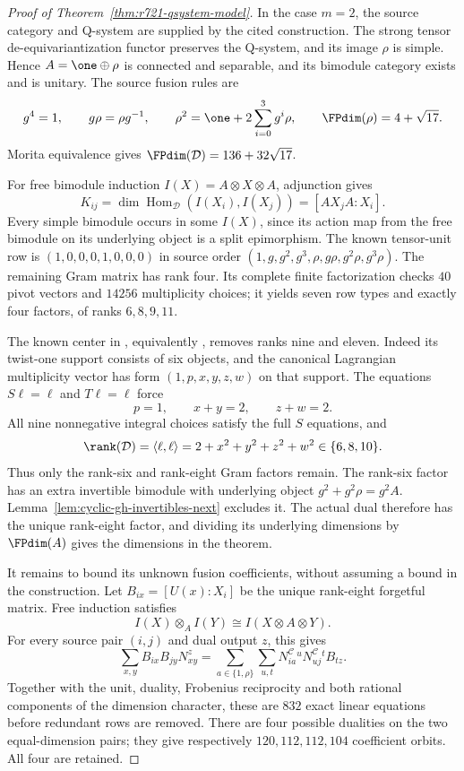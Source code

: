 \begin{proof}[Proof of Theorem~\ref{thm:r721-qsystem-model}]
In the case $m=2$, the source category and Q-system are supplied by the
cited construction. The strong tensor de-equivariantization functor
preserves the Q-system, and its image $\rho$ is simple. Hence
$A=\one\oplus\rho$ is connected and separable, and its bimodule category
exists and is unitary. The source fusion rules are
\[
 g^4=1,\qquad g\rho=\rho g^{-1},\qquad
 \rho^2=\one+2\sum_{i=0}^3g^i\rho,
 \qquad \FPdim(\rho)=4+\sqrt{17}.
\]
Morita equivalence gives
$\FPdim(\mathcal D)=136+32\sqrt{17}$.

For free bimodule induction $I(X)=A\otimes X\otimes A$, adjunction gives
\[
 K_{ij}=\dim\operatorname{Hom}_{\mathcal D}(I(X_i),I(X_j))
       =[A X_j A:X_i].
\]
Every simple bimodule occurs in some $I(X)$, since its action map from the
free bimodule on its underlying object is a split epimorphism.
The known tensor-unit row is $(1,0,0,0,1,0,0,0)$ in source order
$(1,g,g^2,g^3,\rho,g\rho,g^2\rho,g^3\rho)$.
The remaining Gram matrix has rank four. Its complete finite factorization
checks $40$ pivot vectors and $14256$ multiplicity choices; it yields seven
row types and exactly four factors, of ranks $6,8,9,11$.

The known center in
\cite[Theorem~6.8 and Example~6.10]{GrossmanIzumiCentersNext}, equivalently
\cite[Definition~6.1 and Section~6.1.6]{GrossmanIzumiMetricNext}, removes
ranks nine and eleven. Indeed its twist-one support consists of six objects,
and the canonical Lagrangian multiplicity vector has form
$(1,p,x,y,z,w)$ on that support. The equations $S\ell=\ell$ and
$T\ell=\ell$ force
\[
 p=1,\qquad x+y=2,\qquad z+w=2.
\]
All nine nonnegative integral choices satisfy the full $S$ equations, and
\[
 \rank(\mathcal D)=\langle\ell,\ell\rangle
       =2+x^2+y^2+z^2+w^2\in\{6,8,10\}.
\]
Thus only the rank-six and rank-eight Gram factors remain.
The rank-six factor has an extra invertible bimodule with underlying object
$g^2+g^2\rho=g^2A$. Lemma~\ref{lem:cyclic-gh-invertibles-next} excludes it.
The actual dual therefore has the unique rank-eight factor, and dividing
its underlying dimensions by $\FPdim(A)$ gives the dimensions in the theorem.

It remains to bound its unknown fusion coefficients, without assuming a
bound in the construction. Let $B_{i x}=[U(x):X_i]$ be the unique rank-eight
forgetful matrix. Free induction satisfies
\[
 I(X)\otimes_A I(Y)\cong I(X\otimes A\otimes Y).
\]
For every source pair $(i,j)$ and dual output $z$, this gives
\[
 \sum_{x,y}B_{i x}B_{j y}N_{xy}^{z}
   =\sum_{a\in\{1,\rho\}}\sum_{u,t}
        N^{\mathcal C}_{i a}{}^{u}
        N^{\mathcal C}_{u j}{}^{t} B_{t z}.
\]
Together with the unit, duality, Frobenius reciprocity and both rational
components of the dimension character, these are $832$ exact linear
equations before redundant rows are removed. There are four possible
dualities on the two equal-dimension pairs; they give respectively
$120,112,112,104$ coefficient orbits. All four are retained.


\end{proof}
